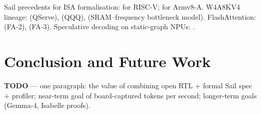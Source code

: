 \documentclass[11pt,a4paper]{article}
\begin{document}
Sail precedents for ISA formalisation: \cite{armstrong2019isa} for
RISC-V; \cite{sailarm2020} for Armv8-A.  W4A8KV4 lineage:
\cite{qserve2024} (QServe), \cite{qqq2024} (QQQ), \cite{sramfreq2025}
(SRAM--frequency bottleneck model).  FlashAttention:
\cite{dao2023flash2} (FA-2), \cite{dao2024flash3} (FA-3).
Speculative decoding on static-graph NPUs: \cite{openpangu2026}.

\section{Conclusion and Future Work}
\label{sec:conclusion}

\textbf{TODO} — one paragraph: the value of combining open RTL +
formal Sail spec + profiler; near-term goal of board-captured
tokens per second; longer-term goals (Gemma-4, Isabelle proofs).



\end{document}
